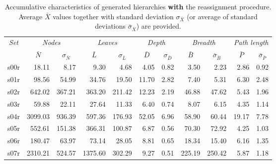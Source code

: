 \begin{table*}[t!]
\setlength{\tabcolsep}{3pt}
\begin{center}
\caption{Accumulative characteristics of generated hierarchies \textbf{with} the reassignment procedure. Average $\bar{X}$ values together with standard deviation $\sigma_{\bar{X}}$ (or average of standard deviations $\bar{\sigma}_{\bar{X}}$) are provided.\label{tab:quantitative-hierarchy-analysis-R}}
\begin{tabular}{crrrrrrrrrr}
\multirow{2}{*}{\textit{\small{Set}}} & \multicolumn{2}{c}{\textit{\small{Nodes}}} & \multicolumn{2}{c}{\textit{\small{Leaves}}} & \multicolumn{2}{c}{\textit{\small{Depth}}} & \multicolumn{2}{c}{\textit{\small{Breadth}}} & \multicolumn{2}{c}{\textit{\small{Path length}}} \\
& \multicolumn{1}{c}{$\bar{N}$} & \multicolumn{1}{c}{$\sigma_{\bar{N}}$} & \multicolumn{1}{c}{$\bar{L}$} & \multicolumn{1}{c}{$\sigma_{\bar{L}}$} & \multicolumn{1}{c}{$\bar{D}$} & \multicolumn{1}{c}{$\sigma_{\bar{D}}$} & \multicolumn{1}{c}{$\bar{B}$} & \multicolumn{1}{c}{$\bar{\sigma}_{\bar{B}}$} & \multicolumn{1}{c}{$\bar{P}$} & \multicolumn{1}{c}{$\bar{\sigma}_{\bar{P}}$} \\ 
\hline
s00r & 18.11 & 8.17 & 9.30 & 4.68 & 4.05 & 0.82 & 3.50 & 2.23 & 2.86 & 0.92 \\
s01r & 98.56 & 54.99 & 34.76 & 19.50 & 11.70 & 2.82 & 7.40 & 5.31 & 6.30 & 2.48 \\
s02r & 642.02 & 367.21 & 363.20 & 211.42 & 12.23 & 2.19 & 46.88 & 47.62 & 5.43 & 1.96 \\
s03r & 59.88 & 22.11 & 27.64 & 11.33 & 6.40 & 0.74 & 8.07 & 6.15 & 4.35 & 1.14 \\
s04r & 3099.03 & 936.39 & 597.36 & 176.93 & 52.05 & 6.96 & 58.90 & 60.44 & 19.17 & 7.78 \\
s05r & 552.61 & 151.38 & 366.31 & 100.87 & 6.87 & 0.56 & 70.30 & 72.92 & 4.25 & 1.03 \\
s06r & 180.47 & 63.97 & 73.14 & 28.05 & 8.81 & 0.65 & 18.34 & 15.40 & 6.16 & 1.35 \\
s07r & 2310.21 & 524.57 & 1375.60 & 302.29 & 9.27 & 0.51 & 225.19 & 250.42 & 5.87 & 1.18 \\
\end{tabular}
\end{center}
\end{table*}